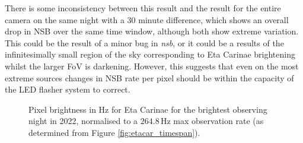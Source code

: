 There is some inconsistency between this result and the result for the entire camera on the same night with a 30 minute difference, which shows an overall drop in NSB over the same time window, although both show extreme variation. This could be the result of a minor bug in \textit{nsb}, or it could be a results of the infinitesimally small region of the sky corresponding to Eta Carinae brightening whilst the larger FoV is darkening. However, this suggests that even on the most extreme sources changes in NSB rate per pixel should be within the capacity of the LED flasher system to correct. 

\begin{figure}[t!]
\begin{centering}
\caption{Pixel brightness in Hz for Eta Carinae for the brightest observing night in 2022, normalised to a $\mathrm{264.8\,}$Hz max observation rate (as determined from Figure \ref{fig:etacar_timespan}).}
\label{fig:etacar_timespan_extreme}
\end{centering}
\end{figure}
\newpage
